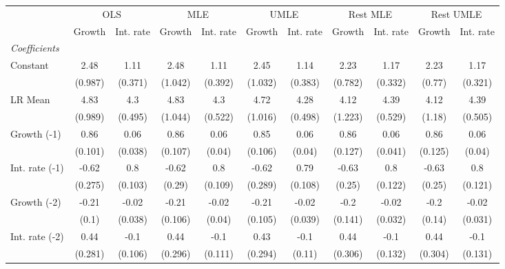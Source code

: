 \begin{table}[htbp] 
	\centering
	\begin{tabular}{@{\extracolsep{4pt}}lcccccccccc@{}}		\hline\hline
		 		 & \multicolumn{2}{c}{OLS} &\multicolumn{2}{c}{MLE} &\multicolumn{2}{c}{UMLE} &\multicolumn{2}{c}{Rest MLE} &\multicolumn{2}{c}{Rest UMLE} \\ 
 		 & Growth 	 & Int. rate 	 & Growth 	 & Int. rate 	 & Growth 	 & Int. rate 	 & Growth 	 & Int. rate 	 & Growth 	 & Int. rate\\\cline{2-3}\cline{4-5}\cline{6-7}\cline{8-9}\cline{10-11}
\rule{0pt}{4ex} 
 \emph{Coefficients} 	  		 & 		 & 		 & 		 & 		 & 		 & 		 & 		 & 		 & 		 &\\ 
\quad Constant 	 & 2.48 	 & 1.11 	 & 2.48 	 & 1.11 	 & 2.45 	 & 1.14 	 & 2.23 	 & 1.17 	 & 2.23 	 & 1.17	 \\ 
 		 & (0.987) 	 & (0.371) 	 & (1.042) 	 & (0.392) 	 & (1.032) 	 & (0.383) 	 & (0.782) 	 & (0.332) 	 & (0.77) 	 & (0.321) 	 \\ 
\quad LR Mean 	 & 4.83 	 & 4.3 	 & 4.83 	 & 4.3 	 & 4.72 	 & 4.28 	 & 4.12 	 & 4.39 	 & 4.12 	 & 4.39	 \\ 
 		 & (0.989) 	 & (0.495) 	 & (1.044) 	 & (0.522) 	 & (1.016) 	 & (0.498) 	 & (1.223) 	 & (0.529) 	 & (1.18) 	 & (0.505) 	 \\ 
\quad Growth (-1) 	 &0.86 	 & 0.06 	 & 0.86 	 & 0.06 	 & 0.85 	 & 0.06 	 & 0.86 	 & 0.06 	 & 0.86 	 & 0.06	 \\ 
 		 & (0.101) 	 & (0.038) 	 & (0.107) 	 & (0.04) 	 & (0.106) 	 & (0.04) 	 & (0.127) 	 & (0.041) 	 & (0.125) 	 & (0.04) 	 \\ 
\quad Int. rate (-1) 	 &-0.62 	 & 0.8 	 & -0.62 	 & 0.8 	 & -0.62 	 & 0.79 	 & -0.63 	 & 0.8 	 & -0.63 	 & 0.8	 \\ 
 		 & (0.275) 	 & (0.103) 	 & (0.29) 	 & (0.109) 	 & (0.289) 	 & (0.108) 	 & (0.25) 	 & (0.122) 	 & (0.25) 	 & (0.121) 	 \\ 
\quad Growth (-2) 	 &-0.21 	 & -0.02 	 & -0.21 	 & -0.02 	 & -0.21 	 & -0.02 	 & -0.2 	 & -0.02 	 & -0.2 	 & -0.02	 \\ 
 		 & (0.1) 	 & (0.038) 	 & (0.106) 	 & (0.04) 	 & (0.105) 	 & (0.039) 	 & (0.141) 	 & (0.032) 	 & (0.14) 	 & (0.031) 	 \\ 
\quad Int. rate (-2) 	 &0.44 	 & -0.1 	 & 0.44 	 & -0.1 	 & 0.43 	 & -0.1 	 & 0.44 	 & -0.1 	 & 0.44 	 & -0.1	 \\ 
 		 & (0.281) 	 & (0.106) 	 & (0.296) 	 & (0.111) 	 & (0.294) 	 & (0.11) 	 & (0.306) 	 & (0.132) 	 & (0.304) 	 & (0.131) 	 \\ 

\end{tabular}
\end{table}
